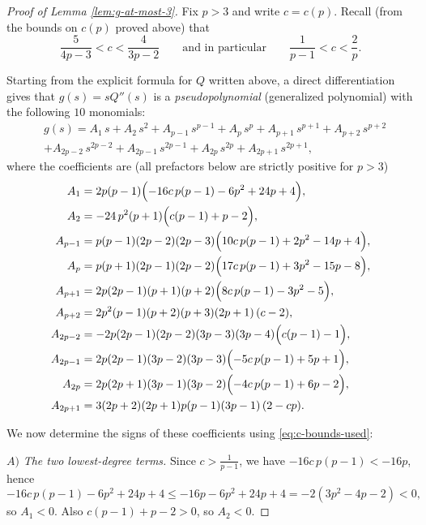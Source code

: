 \documentclass[11pt]{article}
\newtheorem{lemma}[theorem]{Lemma}
\theoremstyle{definition}
\newcommand{\1}{\mathbf{1}}
\begin{document}
\begin{proof}[Proof of Lemma \ref{lem:g-at-most-3}]
Fix $p>3$ and write $c=c(p)$. Recall (from the bounds on $c(p)$ proved above) that
\begin{equation}\label{eq:c-bounds-used}
\frac{5}{4p-3}<c<\frac{4}{3p-2}
\qquad\text{and in particular}\qquad
\frac{1}{p-1}<c<\frac{2}{p}.
\end{equation}

Starting from the explicit formula for $Q$ written above, a direct differentiation gives that
$g(s)=sQ''(s)$ is a \emph{pseudopolynomial} (generalized polynomial) with the following $10$ monomials:
\begin{align}\label{eq:g-expansion}
&g(s)=A_{1}\,s + A_{2}\,s^{2}
+ A_{p-1}\,s^{p-1}+A_{p}\,s^{p}
+ A_{p+1}\,s^{p+1}+A_{p+2}\,s^{p+2} \nonumber \\
&+ A_{2p-2}\,s^{2p-2}+A_{2p-1}\,s^{2p-1}
+ A_{2p}\,s^{2p}+A_{2p+1}\,s^{2p+1},
\end{align}
where the coefficients are (all prefactors below are strictly positive for $p>3$)
\begin{align*}
A_{1} &=
2p(p-1)\Bigl(-16c\,p(p-1)-6p^{2}+24p+4\Bigr),\\
A_{2} &=
-24\,p^{2}(p+1)\Bigl(c(p-1)+p-2\Bigr),\\
A_{p-1} &=
p(p-1)(2p-2)(2p-3)\Bigl(10c\,p(p-1)+2p^{2}-14p+4\Bigr),\\
A_{p} &=
p(p+1)(2p-1)(2p-2)\Bigl(17c\,p(p-1)+3p^{2}-15p-8\Bigr),\\
A_{p+1} &=
2p(2p-1)(p+1)(p+2)\Bigl(8c\,p(p-1)-3p^{2}-5\Bigr),\\
A_{p+2} &=
2p^{2}(p-1)(p+2)(p+3)(2p+1)\,(c-2),\\
A_{2p-2} &=
-2p(2p-1)(2p-2)(3p-3)(3p-4)\Bigl(c(p-1)-1\Bigr),\\
A_{2p-1} &=
2p(2p-1)(3p-2)(3p-3)\Bigl(-5c\,p(p-1)+5p+1\Bigr),\\
A_{2p} &=
2p(2p+1)(3p-1)(3p-2)\Bigl(-4c\,p(p-1)+6p-2\Bigr),\\
A_{2p+1} &=
3(2p+2)(2p+1)p(p-1)(3p-1)\,(2-cp).
\end{align*}

We now determine the signs of these coefficients using \eqref{eq:c-bounds-used}:

\smallskip
\noindent$A)$ \emph{The two lowest-degree terms.}
Since $c>\frac{1}{p-1}$, we have $-16c\,p(p-1)<-16p$, hence
\[
-16c\,p(p-1)-6p^{2}+24p+4
\le -16p-6p^{2}+24p+4=-2(3p^{2}-4p-2)<0,
\]
so $A_{1}<0$. Also $c(p-1)+p-2>0$, so $A_{2}<0$.


\end{proof}
\end{document}
